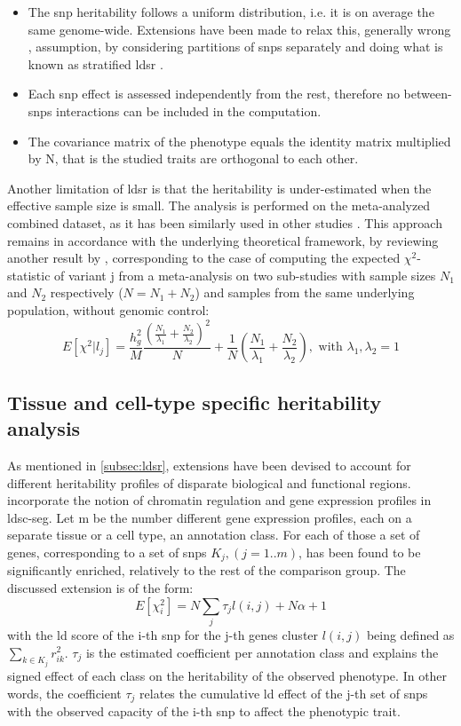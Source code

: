 \begin{itemize}
	\item{The \ac{snp} heritability follows a uniform distribution, i.e. it is on average the same genome-wide. Extensions have been made to relax this, generally wrong \cite{Trynka2013}, assumption, by considering partitions of \acp{snp} separately and doing what is known as stratified \ac{ldsr} \cite{Finucane2015,Finucane2018}.}
	\item{Each \ac{snp} effect is assessed independently from the rest, therefore no between-\acp{snp} interactions can be included in the computation.}
	\item{The covariance matrix of the phenotype equals the identity matrix multiplied by N, that is the studied traits are orthogonal to each other.}
\end{itemize}
Another limitation of \ac{ldsr} is that the heritability is under-estimated when the effective sample size is small\cite{Lee2018}. The analysis is performed on the meta-analyzed combined dataset, as it has been similarly used in other studies \cite{Gialluisi2020,Levey2021}. This approach remains in accordance with the underlying theoretical framework, by reviewing another result by \citet{Bulik-Sullivan2015}, corresponding to the case of computing the expected $\chi^2$-statistic of variant j from a meta-analysis on two sub-studies with sample sizes $N_1$ and $N_2$ respectively ($N=N_1+N_2$) and samples from the same underlying population, without genomic control:
$$
E\left[\chi^2|l_j\right] = \frac{h_g^2}{M} \frac{(\frac{N_1}{\lambda_1} + \frac{N_2}{\lambda_2})^2}{N} + \frac{1}{N}\left(\frac{N_1}{\lambda_1} + \frac{N_2}{\lambda_2}\right) , \text{ with } \lambda_1,\lambda_2=1
$$


\subsection{Tissue and cell-type specific heritability analysis}
As mentioned in \autoref{subsec:ldsr}, extensions have been devised to account for different heritability profiles of disparate biological and functional regions. \citet{Finucane2018} incorporate the notion of chromatin regulation and gene expression profiles in \ac{ldsc-seg}. Let m be the number different gene expression profiles, each on a separate tissue or a cell type, an annotation class. For each of those a set of genes, corresponding to a set of \acp{snp} $K_j,(j=1..m)$, has been found to be significantly enriched, relatively to the rest of the comparison group. The discussed extension is of the form:
$$
E\left[\chi^2_i\right]= N \sum_j{\tau_j l(i,j)} + N \alpha + 1
$$
with the \ac{ld} score of the i-th \ac{snp} for the j-th genes cluster $l(i,j)$ being defined as $\sum_{k \in K_j} r^2_{ik}$. $\tau_j$ is the estimated coefficient per annotation class and explains the signed effect of each class on the heritability of the observed phenotype. In other words, the coefficient $\tau_j$ relates the cumulative \ac{ld} effect of the j-th set of \acp{snp} with the observed capacity of the i-th \ac{snp} to affect the phenotypic trait. 

